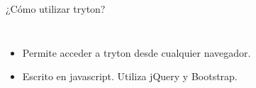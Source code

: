 \begin{frame}[fragile=singleslide]{¿Cómo utilizar tryton?}
\begin{columns}
            \fontsize{10}{8}\selectfont
            \begin{itemize}
                \item Permite acceder a tryton desde cualquier navegador.
                \item Escrito en javascript. Utiliza jQuery y Bootstrap.
            \end{itemize}
        \end{columns}

	\end{frame}

%
%
